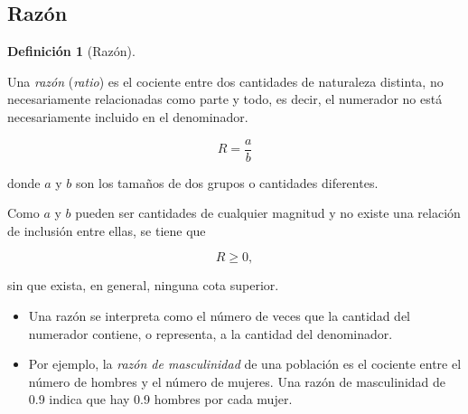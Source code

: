 \documentclass[
  spanish,
  a4paper,
]{scrreport}
\providecommand{\tightlist}{%
  \setlength{\itemsep}{0pt}\setlength{\parskip}{0pt}}
\theoremstyle{definition}
\theoremstyle{definition}
\newtheorem{definition}{Definición}[chapter]
\theoremstyle{remark}
\begin{document}
\subsection{Razón}\label{razuxf3n}

\begin{definition}[Razón]\protect\hypertarget{def-descriptivos-razon}{}\label{def-descriptivos-razon}

Una \emph{razón} (\emph{ratio}) es el cociente entre dos cantidades de
naturaleza distinta, no necesariamente relacionadas como parte y todo,
es decir, el numerador no está necesariamente incluido en el
denominador.

\[R = \frac{a}{b}\]

donde \(a\) y \(b\) son los tamaños de dos grupos o cantidades
diferentes.

\end{definition}

\begin{tcolorbox}[enhanced jigsaw, arc=.35mm, bottomrule=.15mm, bottomtitle=1mm, breakable, colback=white, colbacktitle=quarto-callout-important-color!10!white, colframe=quarto-callout-important-color-frame, coltitle=black, left=2mm, leftrule=.75mm, opacityback=0, opacitybacktitle=0.6, rightrule=.15mm, title=\textcolor{quarto-callout-important-color}{\faExclamation}\hspace{0.5em}{Importante}, titlerule=0mm, toprule=.15mm, toptitle=1mm]

Como \(a\) y \(b\) pueden ser cantidades de cualquier magnitud y no
existe una relación de inclusión entre ellas, se tiene que

\[R \geq 0,\]

sin que exista, en general, ninguna cota superior.

\end{tcolorbox}

\begin{tcolorbox}[enhanced jigsaw, arc=.35mm, bottomrule=.15mm, bottomtitle=1mm, breakable, colback=white, colbacktitle=quarto-callout-note-color!10!white, colframe=quarto-callout-note-color-frame, coltitle=black, left=2mm, leftrule=.75mm, opacityback=0, opacitybacktitle=0.6, rightrule=.15mm, title=\textcolor{quarto-callout-note-color}{\faInfo}\hspace{0.5em}{Interpretación}, titlerule=0mm, toprule=.15mm, toptitle=1mm]

\begin{itemize}
\tightlist
\item
  Una razón se interpreta como el número de veces que la cantidad del
  numerador contiene, o representa, a la cantidad del denominador.
\item
  Por ejemplo, la \emph{razón de masculinidad} de una población es el
  cociente entre el número de hombres y el número de mujeres. Una razón
  de masculinidad de 0.9 indica que hay 0.9 hombres por cada mujer.
\end{itemize}

\end{tcolorbox}
\end{document}
